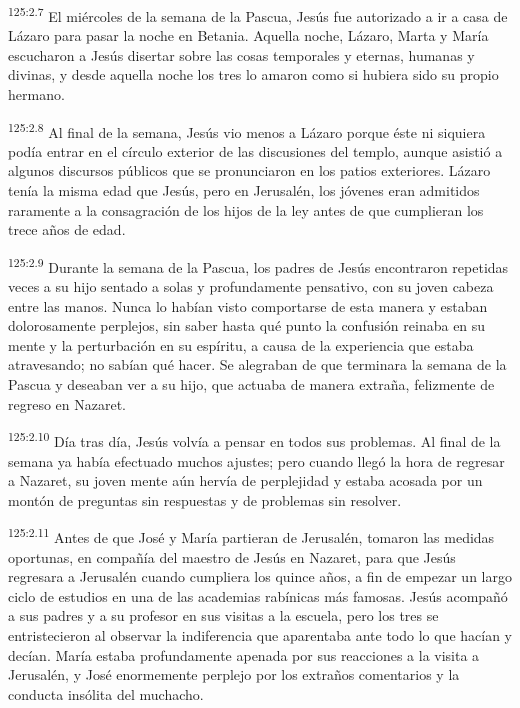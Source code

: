 \par 
\textsuperscript{125:2.7} El miércoles de la semana de la Pascua, Jesús fue autorizado a ir a casa de Lázaro para pasar la noche en Betania. Aquella noche, Lázaro, Marta y María escucharon a Jesús disertar sobre las cosas temporales y eternas, humanas y divinas, y desde aquella noche los tres lo amaron como si hubiera sido su propio hermano.

\par 
\textsuperscript{125:2.8} Al final de la semana, Jesús vio menos a Lázaro porque éste ni siquiera podía entrar en el círculo exterior de las discusiones del templo, aunque asistió a algunos discursos públicos que se pronunciaron en los patios exteriores. Lázaro tenía la misma edad que Jesús, pero en Jerusalén, los jóvenes eran admitidos raramente a la consagración de los hijos de la ley antes de que cumplieran los trece años de edad.

\par 
\textsuperscript{125:2.9} Durante la semana de la Pascua, los padres de Jesús encontraron repetidas veces a su hijo sentado a solas y profundamente pensativo, con su joven cabeza entre las manos. Nunca lo habían visto comportarse de esta manera y estaban dolorosamente perplejos, sin saber hasta qué punto la confusión reinaba en su mente y la perturbación en su espíritu, a causa de la experiencia que estaba atravesando; no sabían qué hacer. Se alegraban de que terminara la semana de la Pascua y deseaban ver a su hijo, que actuaba de manera extraña, felizmente de regreso en Nazaret.

\par 
\textsuperscript{125:2.10} Día tras día, Jesús volvía a pensar en todos sus problemas. Al final de la semana ya había efectuado muchos ajustes; pero cuando llegó la hora de regresar a Nazaret, su joven mente aún hervía de perplejidad y estaba acosada por un montón de preguntas sin respuestas y de problemas sin resolver.

\par 
\textsuperscript{125:2.11} Antes de que José y María partieran de Jerusalén, tomaron las medidas oportunas, en compañía del maestro de Jesús en Nazaret, para que Jesús regresara a Jerusalén cuando cumpliera los quince años, a fin de empezar un largo ciclo de estudios en una de las academias rabínicas más famosas. Jesús acompañó a sus padres y a su profesor en sus visitas a la escuela, pero los tres se entristecieron al observar la indiferencia que aparentaba ante todo lo que hacían y decían. María estaba profundamente apenada por sus reacciones a la visita a Jerusalén, y José enormemente perplejo por los extraños comentarios y la conducta insólita del muchacho.

